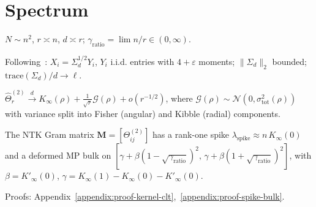 \section{Spectrum}\label{sec:spectra}

\begin{assumption}\label{assump:RMT}
\( N \sim n^2 \), \( r \asymp n \), \( d \asymp r \); \( \gamma_{\mathrm{ratio}} = \lim n/r \in (0,\infty) \).
\end{assumption}
\begin{assumption}\label{assump:RMT-conditions}
Following~\cite{El_Karoui_2010}: \( X_i = \Sigma_d^{1/2} Y_i \), \( Y_i \) i.i.d. entries with \( 4+\varepsilon \) moments; \( \|\Sigma_d\|_2 \) bounded; \( \mathrm{trace}(\Sigma_d)/d \to \ell \).
\end{assumption}

\begin{theorem}\label{thm:kernel_clt}
\( \hat{\Theta}^{(2)}_r \xrightarrow{d} K_{\infty}(\rho) + \frac{1}{\sqrt{r}}\mathcal{G}(\rho) + o(r^{-1/2}) \), where \( \mathcal{G}(\rho) \sim \mathcal{N}(0,\sigma_{\mathrm{tot}}^2(\rho)) \) with variance split into Fisher (angular) and Kibble (radial) components.
\end{theorem}

\begin{theorem}\label{thm:spike-bulk}
The NTK Gram matrix \( \mathbf{M} = [\Theta^{(2)}_{ij}] \) has a rank-one spike \( \lambda_{\mathrm{spike}} \approx n\,K_{\infty}(0) \) and a deformed MP bulk on \( [\gamma + \beta(1-\sqrt{\gamma_{\mathrm{ratio}}})^2,\, \gamma + \beta(1+\sqrt{\gamma_{\mathrm{ratio}}})^2] \), with \( \beta = K'_{\infty}(0) \), \( \gamma = K_{\infty}(1) - K_{\infty}(0) - K'_{\infty}(0) \).
\end{theorem}
Proofs: Appendix~\ref{appendix:proof-kernel-clt},~\ref{appendix:proof-spike-bulk}.
